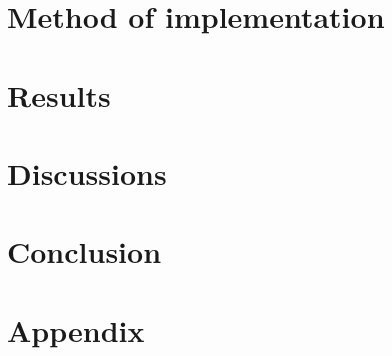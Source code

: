 \documentclass[12pt]{report}
\begin{document}
\chapter{Method of implementation} \label{ch:method_implementation}


\chapter{Results} \label{ch:results}


\chapter{Discussions}\label{ch: Discussions}


\chapter{Conclusion} \label{ch:conclusion}


\printbibliography

\chapter{Appendix} \label{ch:appendix}

\end{document}
